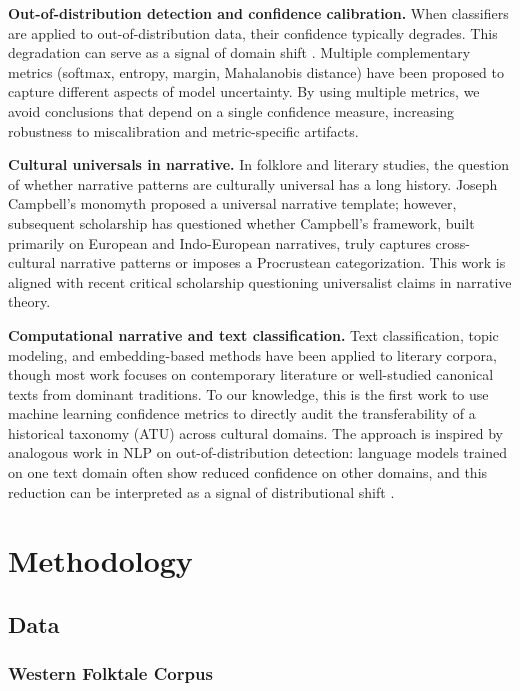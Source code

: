 \documentclass{article}
\begin{document}
\textbf{Out-of-distribution detection and confidence calibration.} When classifiers are applied to out-of-distribution data, their confidence typically degrades. This degradation can serve as a signal of domain shift \citep{lee2018}. Multiple complementary metrics (softmax, entropy, margin, Mahalanobis distance) have been proposed to capture different aspects of model uncertainty. By using multiple metrics, we avoid conclusions that depend on a single confidence measure, increasing robustness to miscalibration and metric-specific artifacts.

\textbf{Cultural universals in narrative.} In folklore and literary studies, the question of whether narrative patterns are culturally universal has a long history. Joseph Campbell's monomyth \citep{thompson1946} proposed a universal narrative template; however, subsequent scholarship has questioned whether Campbell's framework, built primarily on European and Indo-European narratives, truly captures cross-cultural narrative patterns or imposes a Procrustean categorization. This work is aligned with recent critical scholarship questioning universalist claims in narrative theory.

\textbf{Computational narrative and text classification.} Text classification, topic modeling, and embedding-based methods have been applied to literary corpora, though most work focuses on contemporary literature or well-studied canonical texts from dominant traditions. To our knowledge, this is the first work to use machine learning confidence metrics to directly audit the transferability of a historical taxonomy (ATU) across cultural domains. The approach is inspired by analogous work in NLP on out-of-distribution detection: language models trained on one text domain often show reduced confidence on other domains, and this reduction can be interpreted as a signal of distributional shift \citep{guo2017}.

\section{Methodology}

\subsection{Data}

\subsubsection{Western Folktale Corpus}
\end{document}

